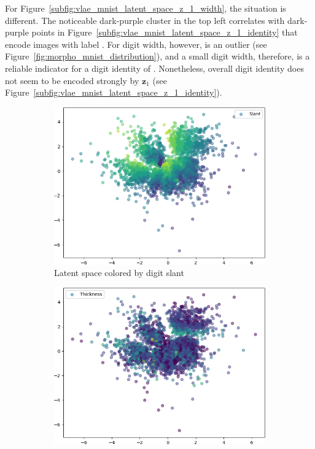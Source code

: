 For Figure~\ref{subfig:vlae_mnist_latent_space_z_1_width}, the situation is different.
The noticeable dark-purple cluster in the top left correlates with dark-purple points in Figure~\ref{subfig:vlae_mnist_latent_space_z_1_identity} that encode images with label .
For digit width, however,  is an outlier (see Figure~\ref{fig:morpho_mnist_distribution}), and a small digit width, therefore, is a reliable indicator for a digit identity of .
Nonetheless, overall digit identity does not seem to be encoded strongly by $\bm{z}_1$ (see Figure~\ref{subfig:vlae_mnist_latent_space_z_1_identity}).

\begin{figure}
    \centering
    \begin{subfigure}{.32\textwidth}
        \includegraphics[width=\textwidth]{images/latent_spaces/mnist/vae/embeddings_mu_0.png}
        \caption{Latent space colored by digit slant}
        \label{subfig:vae_mnist_latent_space_slant}
    \end{subfigure}
    \hfill
    \begin{subfigure}{.32\textwidth}
        \includegraphics[width=\textwidth]{images/latent_spaces/mnist/vae/embeddings_mu_1.png}

\end{subfigure}
\end{figure}
